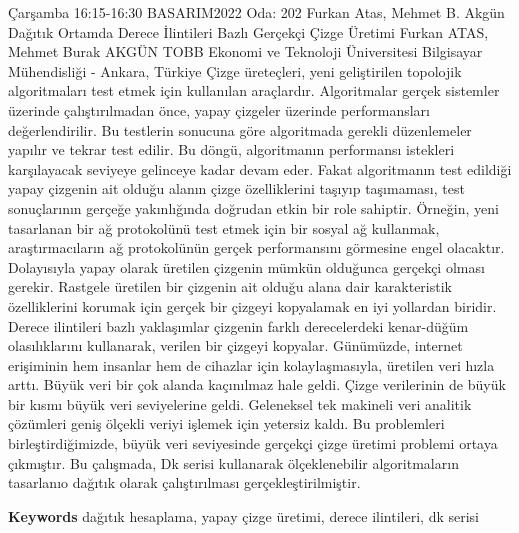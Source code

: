 
    \begin{abstract_basarim}
    {Çarşamba 16:15-16:30}
    {BASARIM2022}
    {Oda: 202}
    {Furkan Atas, Mehmet B. Akgün}
    {Dağıtık Ortamda Derece İlintileri Bazlı Gerçekçi Çizge Üretimi}
    {%
    Furkan ATAS, Mehmet Burak AKGÜN}
    {%
    }
    {%
    TOBB Ekonomi ve Teknoloji Üniversitesi Bilgisayar Mühendisliği - Ankara, Türkiye}
    Çizge üreteçleri, yeni geliştirilen topolojik algoritmaları test etmek için kullanılan araçlardır. Algoritmalar gerçek sistemler üzerinde çalıştırılmadan önce, yapay çizgeler üzerinde performansları değerlendirilir. Bu testlerin sonucuna göre algoritmada gerekli düzenlemeler yapılır ve tekrar test edilir. Bu döngü, algoritmanın performansı istekleri karşılayacak seviyeye gelinceye kadar devam eder. Fakat algoritmanın test edildiği yapay çizgenin ait olduğu alanın çizge özelliklerini taşıyıp taşımaması, test sonuçlarının gerçeğe yakınlığında doğrudan etkin bir role sahiptir. Örneğin, yeni tasarlanan bir ağ protokolünü test etmek için bir sosyal ağ kullanmak, araştırmacıların ağ protokolünün gerçek performansını görmesine engel olacaktır. Dolayısıyla yapay olarak üretilen çizgenin mümkün olduğunca gerçekçi olması gerekir. Rastgele üretilen bir çizgenin ait olduğu alana dair karakteristik özelliklerini korumak için gerçek bir çizgeyi kopyalamak en iyi yollardan biridir. Derece ilintileri bazlı yaklaşımlar çizgenin farklı derecelerdeki kenar-düğüm olasılıklarını kullanarak, verilen bir çizgeyi kopyalar. Günümüzde, internet erişiminin hem insanlar hem de cihazlar için kolaylaşmasıyla, üretilen veri hızla arttı. Büyük veri bir çok alanda kaçınılmaz hale geldi. Çizge verilerinin de büyük bir kısmı büyük veri seviyelerine geldi. Geleneksel tek makineli veri analitik çözümleri geniş ölçekli veriyi işlemek için yetersiz kaldı. Bu problemleri birleştirdiğimizde, büyük veri seviyesinde gerçekçi çizge üretimi problemi ortaya çıkmıştır. Bu çalışmada, Dk serisi kullanarak ölçeklenebilir algoritmaların tasarlanıo dağıtık olarak çalıştırılması gerçekleştirilmiştir. 
    
        \textbf{Keywords} \newline{}dağıtık hesaplama, yapay çizge üretimi, derece ilintileri, dk serisi
    \end{abstract_basarim}
    